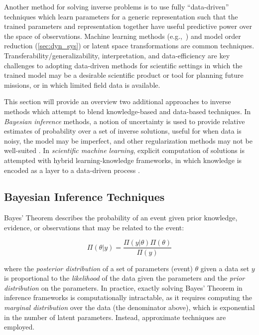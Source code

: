 Another method for solving inverse problems is to use fully ``data-driven'' techniques which learn parameters for a generic representation such that the trained parameters and representation together have useful predictive power over the space of observations. Machine learning methods (e.g.,~\cite{lu2020extracting,follmann2019predicting,blanchard2019learning,chen2019presentation,pathak2018model}) and model order reduction (\cref{sec:dyn_sys}) or latent space transformations \autocite{bigoni2019greedy,spantini2018inference} are common techniques. Transferability/generalizability, interpretation, and data-efficiency are key challenges to adopting data-driven methods for scientific settings in which the trained model may be a desirable scientific product or tool for planning future missions, or in which limited field data is available.

This section will provide an overview two additional approaches to inverse methods which attempt to blend knowledge-based and data-based techniques. In \emph{Bayesian inference} methods, a notion of uncertainty is used to provide relative estimates of probability over a set of inverse solutions, useful for when data is noisy, the model may be imperfect, and other regularization methods may not be well-suited \autocite{stuart2010inverse}. In \emph{scientific machine learning}, explicit computation of solutions is attempted with hybrid learning-knowledge frameworks, in which knowledge is encoded as a layer to a data-driven process \autocite{baker2019workshop}.

\subsection{Bayesian Inference Techniques}
Bayes' Theorem \autocite{bayes1763lii} describes the probability of an event given prior knowledge, evidence, or observations that may be related to the event:

\begin{equation}
    \Pi(\theta | y) = \frac{\Pi(y | \theta)\Pi(\theta)}{\Pi(y)}
\end{equation}

\noindent where the \emph{posterior distribution} of a set of parameters (event) $\theta$ given a data set $y$ is proportional to the \emph{likelihood} of the data given the parameters and the \emph{prior distribution} on the parameters. In practice, exactly solving Bayes' Theorem in inference frameworks is computationally intractable, as it requires computing the \emph{marginal distribution} over the data (the denominator above), which is exponential in the number of latent parameters. Instead, approximate techniques are employed.

